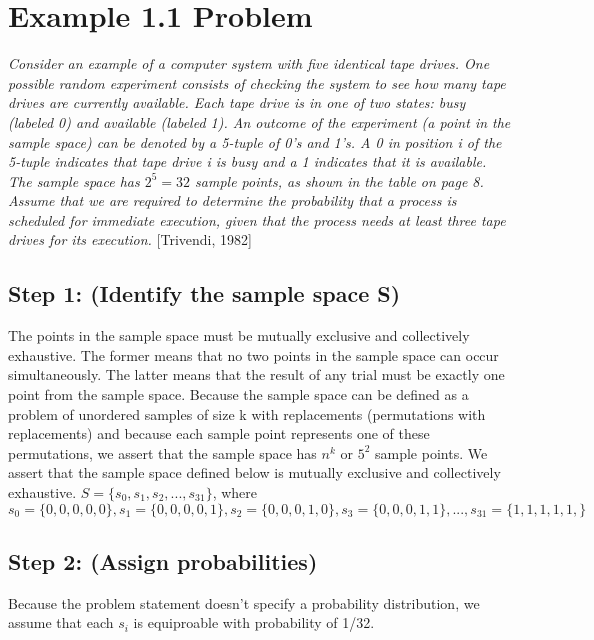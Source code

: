 \documentclass[a4paper,10pt]{article}
\title{}
\author{Mark Johnson \\
Loyola University Chicago}
\date {mjohnson4@luc.edu}
\begin{document}
\maketitle
\section{Example 1.1 Problem}
\emph{Consider an example of a computer system with five identical tape drives. One possible random experiment 
consists of checking the system to see how many tape drives are currently available. Each tape drive is in one of 
two states: busy (labeled 0) and available (labeled 1). An outcome of the experiment (a point in the sample space) 
can be denoted by a 5-tuple of 0's and 1's. A 0 in position i of the 5-tuple indicates that tape drive i is busy and 
a 1 indicates that it is available. The sample space has $ 2^{5}=32 $ sample points, as shown in the table on page 8. 
Assume that we are required to determine the probability that a process is scheduled for immediate execution, given 
that the process needs at least three tape drives for its execution.} [Trivendi, 1982]
\subsection{Step 1: (Identify the sample space S)}
The points in the sample space must be mutually exclusive and collectively exhaustive. The former means that no two 
points in the sample space can occur simultaneously. The latter means that the result of any trial must be exactly 
one point from the sample space. Because the sample space can be defined as a problem of unordered samples of size k 
with replacements (permutations with replacements) and because each sample point represents one of these 
permutations, we assert that the sample space has $ n^{k} $ or $ 5^{2} $ sample points. We assert that the sample 
space 
defined below is mutually exclusive and collectively exhaustive. \newline
$ S = \{s_{0}, s_{1}, s_{2},..., s_{31}\} $, where $ s_{0} = \{0,0,0,0,0\}, s_{1} = \{0,0,0,0,1\}, s_{2} = \{0,0,0,1,0\}, s_{3} = \{0,0,0,1,1\},..., s_{31} = 
\{1,1,1,1,1,\} $
\subsection{Step 2: (Assign probabilities)}
Because the problem statement doesn't specify a probability distribution, we assume that each $ s_{i} $ is 
equiproable with probability of 1/32.
\end{document}
